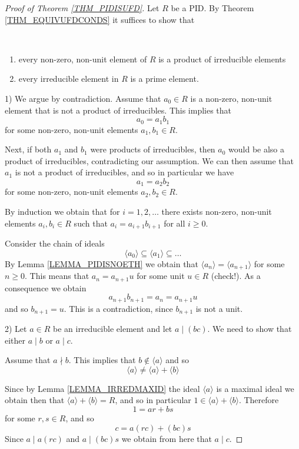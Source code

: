 \documentclass[12pt, letterpaper, oneside]{article}
\theoremstyle{plain}
\theoremstyle{definition}
\newcommand{\subgp}[1]{\langle#1\rangle}
\newcommand{\benu}{\begin{enumerate}}
\newcommand{\eenu}{\end{enumerate}}
\newcommand{\vs}{\vskip 5mm}
\newcommand{\isep}[1][0]{\setlength{\itemsep}{#1 mm}}
\begin{document}
\begin{proof}[Proof of Theorem \ref{THM_PIDISUFD}]
Let $R$ be a PID. By Theorem \ref{THM_EQUIVUFDCONDS} it suffices to show that 
\vskip -13mm

\ 
\benu
\isep[0]
\item every non-zero, non-unit element of $R$ is a product of irreducible elements
\item every irreducible element in $R$ is a prime element. 
\eenu


1) We argue by contradiction. Assume that $a_{0}\in R$ is a non-zero, non-unit element that is 
not a product of irreducibles. This implies that 
$$a_{0} = a_{1}b_{1}$$
for some non-zero, non-unit elements  $a_{1}, b_{1}\in R$.

Next, if both $a_{1}$ and $b_{1}$ were products of irreducibles, then $a_{0}$ would be also 
a product of irreducibles, contradicting our assumption.  We can then assume that $a_{1}$ is not
a product of irreducibles, and so in particular we have 
$$a_{1} = a_{2}b_{2}$$  
for some non-zero, non-unit elements $a_{2}, b_{2}\in R$.

By induction we obtain that for $i=1, 2, \dots $ there exists non-zero, non-unit elements 
$a_{i}, b_{i} \in R$  such that $a_{i} = a_{i+1}b_{i+1}$ for all $i\geq 0$. 

Consider the chain of ideals
$$\subgp{a_{0}}\subseteq \subgp{a_{1}} \subseteq \dots $$
By Lemma \ref{LEMMA_PIDISNOETH} we obtain that $\subgp{a_{n}}=\subgp{a_{n+1}}$
for some $n\geq 0$. This means that $a_{n} = a_{n+1}u$ for some unit $u\in R$ (check!). 
As a consequence we obtain 
$$a_{n+1}b_{n+1} = a_{n} = a_{n+1}u$$
and so $b_{n+1}=u$. This is a contradiction, since  $b_{n+1}$ is not a unit.

\vs\vs


2) Let $a\in R$ be an irreducible element and let $a\mid (bc)$. We need to show that 
either $a\mid b$ or $a\mid c$.

Assume that $a\nmid b$. This implies that $b\not\in \subgp{a}$ and so 
$$\subgp{a} \neq \subgp{a} + \subgp{b}$$ 

Since 
by Lemma \ref{LEMMA_IRREDMAXID} the ideal $\subgp{a}$ is a maximal ideal we obtain 
then that $ \subgp{a} + \subgp{b} = R$, and so in particular $1\in  \subgp{a} + \subgp{b}$. 
Therefore 
$$1 = ar+bs$$
for some $r, s\in R$, and so 
$$c = a(rc) + (bc)s $$
Since $a \mid a(rc)$ and $a\mid (bc)s$ we obtain from here that $a\mid c$.

\end{proof}
\end{document}
